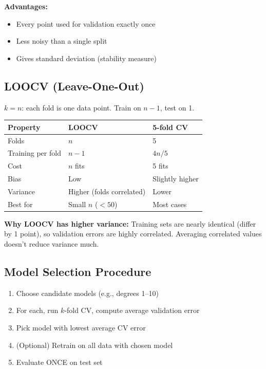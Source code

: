 \documentclass[11pt,a4paper]{article}
\begin{document}
\textbf{Advantages:}
\begin{itemize}
    \item Every point used for validation exactly once
    \item Less noisy than a single split
    \item Gives standard deviation (stability measure)
\end{itemize}

\subsection{LOOCV (Leave-One-Out)}

$k = n$: each fold is one data point. Train on $n-1$, test on 1.

\begin{center}
\begin{tabular}{|l|l|l|}
\hline
\textbf{Property} & \textbf{LOOCV} & \textbf{5-fold CV} \\
\hline
Folds & $n$ & 5 \\
Training per fold & $n-1$ & $4n/5$ \\
Cost & $n$ fits & 5 fits \\
Bias & Low & Slightly higher \\
Variance & Higher (folds correlated) & Lower \\
Best for & Small $n$ ($<50$) & Most cases \\
\hline
\end{tabular}
\end{center}

\textbf{Why LOOCV has higher variance:} Training sets are nearly identical (differ by 1 point), so validation errors are highly correlated. Averaging correlated values doesn't reduce variance much.

\subsection{Model Selection Procedure}

\begin{enumerate}
    \item Choose candidate models (e.g., degrees 1--10)
    \item For each, run $k$-fold CV, compute average validation error
    \item Pick model with lowest average CV error
    \item (Optional) Retrain on all data with chosen model
    \item Evaluate ONCE on test set
\end{enumerate}
\end{document}
